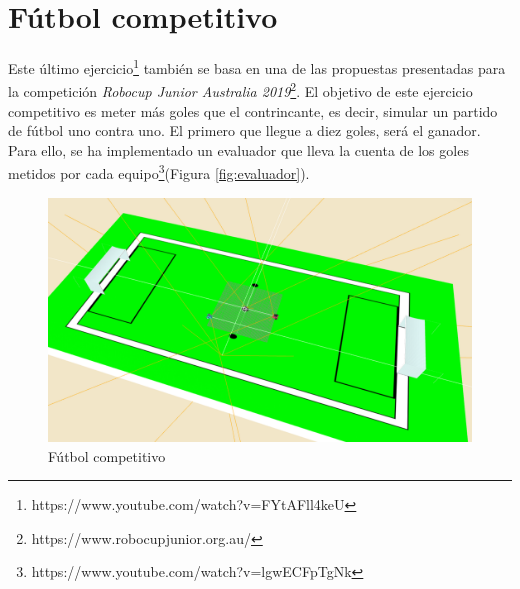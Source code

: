 \section{Fútbol competitivo}
Este último ejercicio\footnote{https://www.youtube.com/watch?v=FYtAFll4keU} también se basa en una de las propuestas presentadas para la competición \textit{Robocup Junior Australia 2019}\footnote{https://www.robocupjunior.org.au/}. El objetivo de este ejercicio competitivo es meter más goles que el contrincante, es decir, simular un partido de fútbol uno contra uno. El primero que llegue a diez goles, será el ganador. Para ello, se ha implementado un evaluador que lleva la cuenta de los goles metidos por cada equipo\footnote{https://www.youtube.com/watch?v=lgwECFpTgNk}(Figura \ref{fig:evaluador}). 

\begin{figure}[h!]
    \centering
    \includegraphics[width=\textwidth, height=0.8\textwidth]{poteria.png}
    \caption{Fútbol competitivo}
    \label{fig:futbol}
\end{figure}

